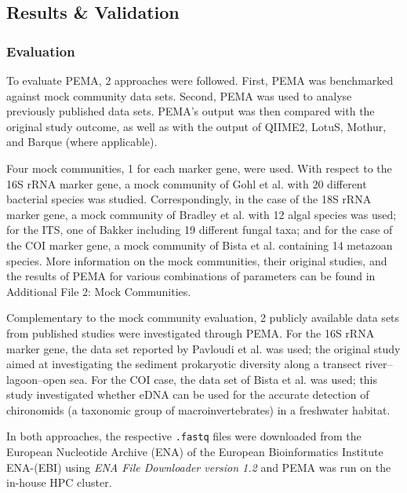       
   \subsection{Results \& Validation}

   \subsubsection*{Evaluation}

      To evaluate PEMA, 2 approaches were followed. 
      First, PEMA was benchmarked against mock community data sets. 
      Second, PEMA was used to analyse previously published data sets. 
      PEMA's output was then compared with the original study outcome, as well as with the output of QIIME2, LotuS, Mothur, and Barque (where applicable).

      Four mock communities, 1 for each marker gene, were used. With respect to the 16S rRNA marker gene, a mock community of Gohl et al. \citep{gohl2016systematic} with 20 different bacterial species was studied. 
      Correspondingly, in the case of the 18S rRNA marker gene, a mock community of Bradley et al. \citep{bradley2016} with 12 algal species was used; 
      for the ITS, one of Bakker \citep{bakker2018fungal} including 19 different fungal taxa; 
      and for the case of the COI marker gene, a mock community of Bista et al. \citep{bista2018performance} containing 14 metazoan species. 
      More information on the mock communities, their original studies, and the results of PEMA for various combinations of parameters can be found in Additional File 2: Mock Communities.

      Complementary to the mock community evaluation, 2 publicly available data sets from published studies were investigated through PEMA. 
      For the 16S rRNA marker gene, the data set reported by Pavloudi et al. \citep{pavloudi2017sediment} was used; 
      the original study aimed at investigating the sediment prokaryotic diversity along a transect river–lagoon–open sea. 
      For the COI case, the data set of Bista et al. \citep{bista2017annual} was used; 
      this study investigated whether eDNA can be used for the accurate detection of chironomids (a taxonomic group of macroinvertebrates) in a freshwater habitat.

      In both approaches, the respective \texttt{.fastq} files were downloaded from the European Nucleotide Archive (ENA) of the European Bioinformatics Institute ENA-(EBI) using \textit{ENA File Downloader version 1.2} \citep{harrison2019european} and PEMA was run on the in-house HPC cluster.

